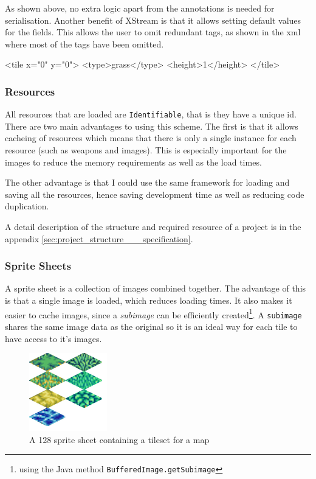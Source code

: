 As shown above, no extra logic apart from the annotations is needed for serialisation.  Another benefit of XStream is that it allows setting default values for the fields. This allows the user to omit redundant tags, as shown in the xml where most of the tags have been omitted.
\begin{lst:tile}[caption=Serialised form of the above class. ]
<tile x="0" y="0">
	<type>grass</type>
	<height>1</height>
</tile>
\end{lst:tile}


\subsubsection{Resources}

All resources that are loaded are \texttt{Identifiable}, that is they have a unique id.  There are two main advantages to using this scheme. The first is that it allows cacheing of resources which means that there is only a single instance for each resource (such as weapons and images). This is especially important for the images to reduce the memory requirements as well as the load times.

The other advantage is that I could use the same framework for loading and saving all the resources, hence saving development time as well as reducing code duplication. 

A detail description of the structure and  required resource of a project is in the appendix \ref{sec:project_structure___specification}.

\subsubsection{Sprite Sheets}
\label{ssub:sprite_sheets}


A sprite sheet is a collection of images combined together. The advantage of this is that a single image is loaded, which reduces loading times. It also makes it easier to cache images, since a \emph{subimage} can be efficiently created\footnote{using the Java method \texttt{BufferedImage.getSubimage}}. A \texttt{subimage} shares the same image data as the original so it is an ideal way for each tile to have access to it's images\cite{bufferedImage}.    

\begin{figure}[htbp]
	\centering
		\includegraphics{figures/tileset.png}
	\caption{A 128 sprite sheet containing a tileset for a map}
	\label{fig:figures_tileset}
\end{figure}

